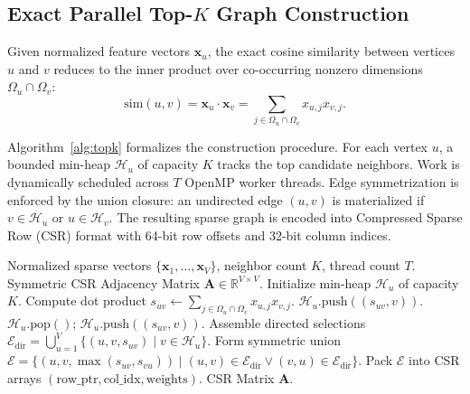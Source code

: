 \documentclass[conference]{IEEEtran}
\begin{document}
\subsection{Exact Parallel Top-$K$ Graph Construction}
Given normalized feature vectors $\mathbf{x}_u$, the exact cosine similarity between vertices $u$ and $v$ reduces to the inner product over co-occurring nonzero dimensions $\Omega_u \cap \Omega_v$:
\begin{equation}
\label{eq:cosine}
\mathrm{sim}(u, v) = \mathbf{x}_u \cdot \mathbf{x}_v = \sum_{j \in \Omega_u \cap \Omega_v} x_{u,j} x_{v,j}.
\end{equation}

Algorithm~\ref{alg:topk} formalizes the construction procedure. For each vertex $u$, a bounded min-heap $\mathcal{H}_u$ of capacity $K$ tracks the top candidate neighbors. Work is dynamically scheduled across $T$ OpenMP worker threads. Edge symmetrization is enforced by the union closure: an undirected edge $(u, v)$ is materialized if $v \in \mathcal{H}_u$ or $u \in \mathcal{H}_v$. The resulting sparse graph is encoded into Compressed Sparse Row (CSR) format with 64-bit row offsets and 32-bit column indices.

\begin{algorithm}[!t]
\caption{Parallel Exact Top-$K$ Sparse Cosine Graph Construction}
\label{alg:topk}
\begin{algorithmic}[1]
\REQUIRE Normalized sparse vectors $\{\mathbf{x}_1, \dots, \mathbf{x}_V\}$, neighbor count $K$, thread count $T$.
\ENSURE Symmetric CSR Adjacency Matrix $\mathbf{A} \in \mathbb{R}^{V \times V}$.
    \STATE Initialize min-heap $\mathcal{H}_u$ of capacity $K$.
            \STATE Compute dot product $s_{uv} \leftarrow \sum_{j \in \Omega_u \cap \Omega_v} x_{u,j} x_{v,j}$.
                    \STATE $\mathcal{H}_u.\mathrm{push}((s_{uv}, v))$.
                    \STATE $\mathcal{H}_u.\mathrm{pop}()$; $\mathcal{H}_u.\mathrm{push}((s_{uv}, v))$.
                \ENDIF
            \ENDIF
        \ENDIF
    \ENDFOR
\ENDFOR
\STATE Assemble directed selections $\mathcal{E}_{\mathrm{dir}} = \bigcup_{u=1}^V \{(u, v, s_{uv}) \mid v \in \mathcal{H}_u\}$.
\STATE Form symmetric union $\mathcal{E} = \{(u, v, \max(s_{uv}, s_{vu})) \mid (u, v) \in \mathcal{E}_{\mathrm{dir}} \lor (v, u) \in \mathcal{E}_{\mathrm{dir}}\}$.
\STATE Pack $\mathcal{E}$ into CSR arrays $(\mathrm{row\_ptr}, \mathrm{col\_idx}, \mathrm{weights})$.
\RETURN CSR Matrix $\mathbf{A}$.
\end{algorithmic}
\end{algorithm}
\end{document}
